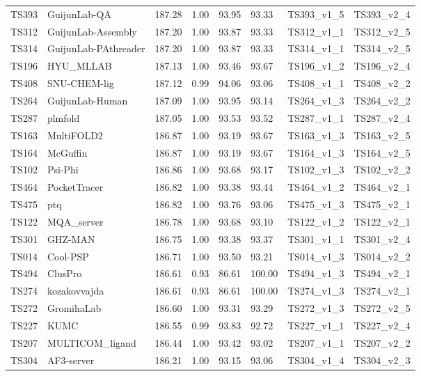 \begin{table}[ht]
{\begin{tabular}{llllllll}
TS393 & GuijunLab-QA & 187.28 & 1.00 & 93.95 & 93.33 & TS393\_v1\_5 & TS393\_v2\_4 \\ 
TS312 & GuijunLab-Assembly & 187.20 & 1.00 & 93.87 & 93.33 & TS312\_v1\_1 & TS312\_v2\_5 \\ 
TS314 & GuijunLab-PAthreader & 187.20 & 1.00 & 93.87 & 93.33 & TS314\_v1\_1 & TS314\_v2\_5 \\ 
TS196 & HYU\_MLLAB & 187.13 & 1.00 & 93.46 & 93.67 & TS196\_v1\_2 & TS196\_v2\_4 \\ 
TS408 & SNU-CHEM-lig & 187.12 & 0.99 & 94.06 & 93.06 & TS408\_v1\_1 & TS408\_v2\_2 \\ 
TS264 & GuijunLab-Human & 187.09 & 1.00 & 93.95 & 93.14 & TS264\_v1\_3 & TS264\_v2\_2 \\ 
TS287 & plmfold & 187.05 & 1.00 & 93.53 & 93.52 & TS287\_v1\_1 & TS287\_v2\_4 \\ 
TS163 & MultiFOLD2 & 186.87 & 1.00 & 93.19 & 93.67 & TS163\_v1\_3 & TS163\_v2\_5 \\ 
TS164 & McGuffin & 186.87 & 1.00 & 93.19 & 93.67 & TS164\_v1\_3 & TS164\_v2\_5 \\ 
TS102 & Psi-Phi & 186.86 & 1.00 & 93.68 & 93.17 & TS102\_v1\_3 & TS102\_v2\_2 \\ 
TS464 & PocketTracer & 186.82 & 1.00 & 93.38 & 93.44 & TS464\_v1\_2 & TS464\_v2\_1 \\ 
TS475 & ptq & 186.82 & 1.00 & 93.76 & 93.06 & TS475\_v1\_3 & TS475\_v2\_1 \\ 
TS122 & MQA\_server & 186.78 & 1.00 & 93.68 & 93.10 & TS122\_v1\_2 & TS122\_v2\_1 \\ 
TS301 & GHZ-MAN & 186.75 & 1.00 & 93.38 & 93.37 & TS301\_v1\_1 & TS301\_v2\_4 \\ 
TS014 & Cool-PSP & 186.71 & 1.00 & 93.50 & 93.21 & TS014\_v1\_3 & TS014\_v2\_2 \\ 
TS494 & ClusPro & 186.61 & 0.93 & 86.61 & 100.00 & TS494\_v1\_3 & TS494\_v2\_1 \\ 
TS274 & kozakovvajda & 186.61 & 0.93 & 86.61 & 100.00 & TS274\_v1\_3 & TS274\_v2\_1 \\ 
TS272 & GromihaLab & 186.60 & 1.00 & 93.31 & 93.29 & TS272\_v1\_3 & TS272\_v2\_5 \\ 
TS227 & KUMC & 186.55 & 0.99 & 93.83 & 92.72 & TS227\_v1\_1 & TS227\_v2\_4 \\ 
TS207 & MULTICOM\_ligand & 186.44 & 1.00 & 93.42 & 93.02 & TS207\_v1\_1 & TS207\_v2\_2 \\ 
TS304 & AF3-server & 186.21 & 1.00 & 93.15 & 93.06 & TS304\_v1\_4 & TS304\_v2\_3 \\ 

\end{tabular}}
\end{table}
